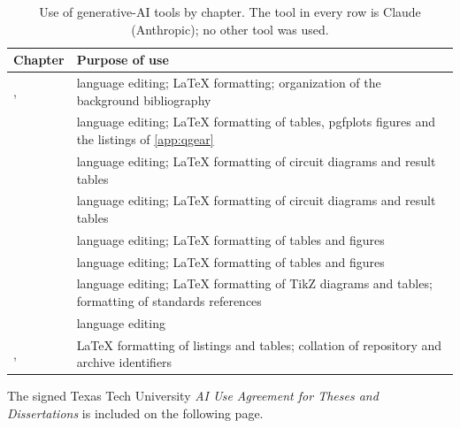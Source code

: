 \begin{table}[htbp]
\caption{Use of generative-AI tools by chapter. The tool in every row is Claude (Anthropic); no other tool was used.}
\label{tab:appai:usage}
\centering
\begingroup\singlespacing\footnotesize
\begin{tabular}{@{}l>{\raggedright\arraybackslash}p{9.2cm}@{}}
\toprule
Chapter & Purpose of use \\
\midrule
{}{ch:intro}, {ch:background} & language editing; \LaTeX{} formatting; organization of the background bibliography \\
{ch:qgear} & language editing; \LaTeX{} formatting of tables, pgfplots figures and the listings of \cref{app:qgear} \\
{ch:nisq} & language editing; \LaTeX{} formatting of circuit diagrams and result tables \\
{ch:qml} & language editing; \LaTeX{} formatting of circuit diagrams and result tables \\
{ch:synthesis} & language editing; \LaTeX{} formatting of tables and figures \\
{ch:qec} & language editing; \LaTeX{} formatting of tables and figures \\
{ch:pqc} & language editing; \LaTeX{} formatting of TikZ diagrams and tables; formatting of standards references \\
{ch:conclusion} & language editing \\
{app:qgear}, {app:repro} & \LaTeX{} formatting of listings and tables; collation of repository and archive identifiers \\
\bottomrule
\end{tabular}
\endgroup
\end{table}

The signed Texas Tech University \emph{AI Use Agreement for Theses and Dissertations} is included on the following page.
